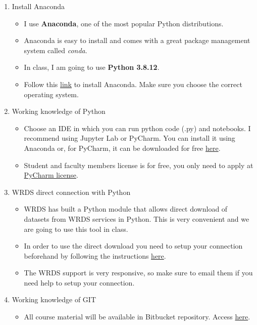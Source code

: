 \documentclass[12pts]{article}
\begin{document}
\begin{enumerate}
	\item Install Anaconda
	\begin{itemize}
		\item I use \textbf{Anaconda}, one of the most popular Python distributions.
		\item Anaconda is easy to install and comes with a great package management system called \textit{conda}.
		\item In class, I am going to use \textbf{Python 3.8.12}.
		\item Follow this \href{https://www.anaconda.com/distribution/}{link} to install Anaconda. Make sure you choose the correct operating system.  
	\end{itemize}
	\item Working knowledge of Python
	\begin{itemize}
		\item Choose an IDE in which you can run python code (.py) and notebooks. I recommend using Jupyter Lab or PyCharm. You can install it using Anaconda or, for PyCharm, it can be downloaded for free \href{https://www.jetbrains.com/pycharm/download/#section=windows}{here}.
		\item Student and faculty members license is for free, you only need to apply at \href{https://www.jetbrains.com/student/}{PyCharm license}. 
	\end{itemize}
    \item WRDS direct connection with Python
    \begin{itemize}
    	\item WRDS has built a Python module that allows direct download of datasets from WRDS services in Python. This is very convenient and we are going to use this tool in class.
    	\item In order to use the direct download you need to setup your connection beforehand by following the instructions \href{https://wrds-www.wharton.upenn.edu/pages/support/programming-wrds/programming-python/python-from-your-computer/}{here}.  
    	\item The WRDS support is very responsive, so make sure to email them if you need help to setup your connection. 
    \end{itemize}
   \item Working knowledge of GIT
	\begin{itemize}
		\item All course material will be available in Bitbucket repository. Access \href{https://bitbucket.org/rkeerati/big-data-2022/src}{here}.

\end{itemize}
\end{enumerate}
\end{document}
